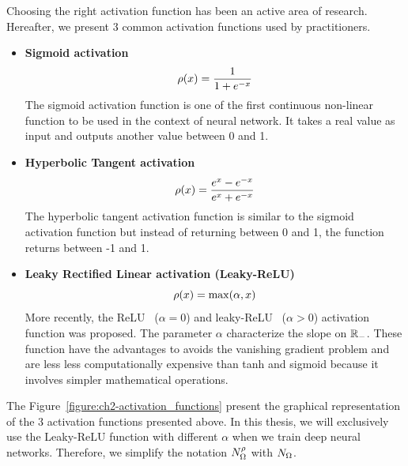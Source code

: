 Choosing the right activation function has been an active area of research. 
Hereafter, we present 3 common activation functions used by practitioners.
\begin{itemize}
  \item \textbf{Sigmoid activation} \cite{han1995influence}
    \begin{equation*}
      \rho(x) = \frac{1}{1+e^{-x}} 
    \end{equation*}
    The sigmoid activation function is one of the first continuous non-linear function to be used in the context of neural network. It takes a real value as input and outputs another value between 0 and 1.
  \item \textbf{Hyperbolic Tangent activation} \cite{karlik2011performance}
    \begin{equation*}
      \rho(x) = \frac{e^x - e^{-x}}{e^x + e^{-x}}
    \end{equation*}
    The hyperbolic tangent activation function is similar to the sigmoid activation function but instead of returning between 0 and 1, the function returns between -1 and 1.     
  \item \textbf{Leaky Rectified Linear activation (Leaky-ReLU)} \cite{maas2013rectifier}
    \begin{equation*}
      \rho(x) = \max(\alpha, x)
    \end{equation*}
    More recently, the ReLU~\cite{nair2010rectified} ($\alpha = 0$) and leaky-ReLU~\cite{maas2013rectifier} ($\alpha > 0$) activation function was proposed.
    The parameter $\alpha$ characterize the slope on $\mathbb{R}_-$.
    These function have the advantages to avoids the vanishing gradient problem and are less less computationally expensive than tanh and sigmoid because it involves simpler mathematical operations.
\end{itemize}

\noindent
The Figure~\ref{figure:ch2-activation_functions} present the graphical representation of the 3 activation functions presented above.
In this thesis, we will exclusively use the Leaky-ReLU function with different $\alpha$ when we train deep neural networks.
Therefore, we simplify the notation $N^\rho_\Omega$ with $N_\Omega$.


